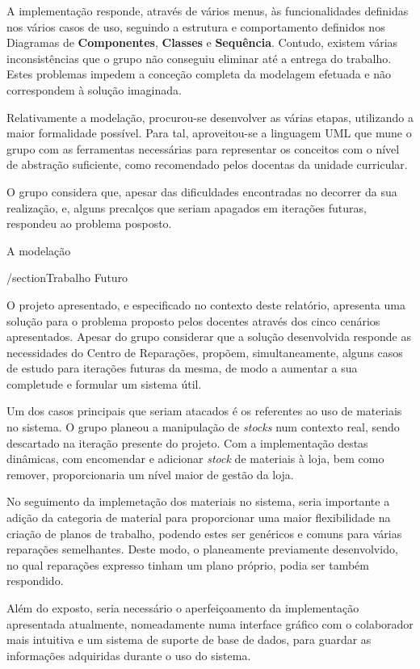 \documentclass[a4paper,12pt]{scrreprt}
\begin{document}
A implementação responde, através de vários menus, às funcionalidades definidas nos vários casos de uso, seguindo a estrutura e 
comportamento definidos nos Diagramas de \textbf{Componentes}, \textbf{Classes} e \textbf{Sequência}. Contudo, existem várias 
inconsistências que o grupo não conseguiu eliminar até a entrega do trabalho.
Estes problemas impedem a conceção completa da modelagem efetuada e não correspondem à solução imaginada.

Relativamente a modelação, procurou-se desenvolver as várias etapas, utilizando a maior formalidade possível. Para tal,
aproveitou-se a linguagem UML que mune o grupo com as ferramentas necessárias para
representar os conceitos com o nível de abstração suficiente, como recomendado pelos docentas da unidade curricular.

O grupo considera que, apesar das dificuldades encontradas no decorrer da sua realização, e, alguns precalços que seriam 
apagados em iterações futuras, respondeu ao problema posposto.

A modelação

/section{Trabalho Futuro}

O projeto apresentado, e especificado no contexto deste relatório, apresenta uma solução para o problema proposto pelos docentes
através dos cinco cenários apresentados. Apesar do grupo considerar que a solução desenvolvida responde as necessidades do Centro de
Reparações, propõem, simultaneamente, alguns casos de estudo para iterações futuras da mesma, de modo a aumentar a sua 
completude e formular um sistema útil.

Um dos casos principais que seriam atacados é os referentes ao uso de materiais no sistema. O grupo planeou a manipulação de \textit{stocks} num
contexto real, sendo descartado na iteração presente do projeto. 
Com a implementação destas dinâmicas, com encomendar e adicionar \textit{stock} de materiais à loja, bem como remover, proporcionaria um nível maior 
de gestão da loja.

No seguimento da implemetação dos materiais no sistema, seria importante a adição da categoria de material para proporcionar uma maior flexibilidade na 
criação de planos de trabalho, podendo estes ser genéricos e comuns para várias reparações semelhantes. Deste modo, o planeamente previamente desenvolvido, no 
qual reparações expresso tinham um plano próprio, podia ser também respondido.

Além do exposto, seria necessário o aperfeiçoamento da implementação apresentada atualmente, nomeadamente numa interface gráfico com o colaborador mais intuitiva
e um sistema de suporte de base de dados, para guardar as informações adquiridas durante o uso do sistema. 
\end{document}
